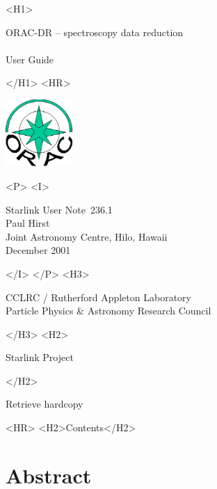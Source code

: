 \documentclass[twoside,11pt]{article}
\newcommand{\stardoccategory}  {Starlink User Note}
\newcommand{\stardocsource}    {sun\stardocnumber}
\newcommand{\stardocnumber}    {236.1}
\newcommand{\stardocauthors}   {Paul Hirst \\
                                Joint Astronomy Centre, Hilo, Hawaii}
\newcommand{\stardocdate}      {December 2001}
\newcommand{\stardoctitle}     {ORAC-DR -- spectroscopy data reduction}
\newcommand{\stardocversion}   {}
\newcommand{\stardocmanual}    {User Guide}
\newcommand{\htmladdnormallink}[2]{#1}
\newcommand{\htmladdimg}[1]{}
\newcommand{\htmlref}[2]{#1}
\newcommand{\htmladdtonavigation}[1]{}
\newcommand{\xlabel}[1]{}
\renewcommand{\_}{\texttt{\symbol{95}}}
\begin{document}
\begin{htmlonly}
   \xlabel{}
   \begin{rawhtml} <H1> \end{rawhtml}
      \stardoctitle\\
      \stardocversion\\
      \stardocmanual
   \begin{rawhtml} </H1> <HR> \end{rawhtml}

\includegraphics[width=1.0in]{sun236_logo.eps}

   \begin{rawhtml} <P> <I> \end{rawhtml}
   \stardoccategory\ \stardocnumber \\
   \stardocauthors \\
   \stardocdate
   \begin{rawhtml} </I> </P> <H3> \end{rawhtml}
      \htmladdnormallink{CCLRC / Rutherford Appleton Laboratory}
                        {http://www.cclrc.ac.uk} \\
      \htmladdnormallink{Particle Physics \& Astronomy Research Council}
                        {http://www.pparc.ac.uk} \\
   \begin{rawhtml} </H3> <H2> \end{rawhtml}
      \htmladdnormallink{Starlink Project}{http://www.starlink.rl.ac.uk/}
   \begin{rawhtml} </H2> \end{rawhtml}
   \htmladdnormallink{\htmladdimg{source.gif} Retrieve hardcopy}
      {http://www.starlink.rl.ac.uk/cgi-bin/hcserver?\stardocsource}\\

  \label{stardoccontents}
  \begin{rawhtml} 
    <HR>
    <H2>Contents</H2>
  \end{rawhtml}
  \htmladdtonavigation{\htmlref{\htmladdimg{contents_motif.gif}}
        {stardoccontents}}

  \section{\xlabel{abstract}Abstract}
\end{htmlonly}
\end{document}
